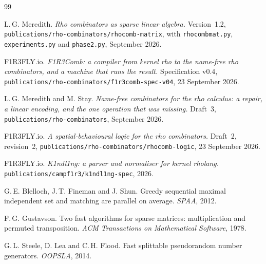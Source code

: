 \documentclass[11pt,a4paper]{article}
\newcommand{\code}[1]{\texttt{#1}}
\theoremstyle{definition}
\theoremstyle{plain}
\begin{document}
\begin{thebibliography}{99}

 L.\,G. Meredith.
\emph{Rho combinators as sparse linear algebra.} Version~1.2,
\code{publications/rho-combinators/rhocomb-matrix}, with \code{rhocombmat.py},
\code{experiments.py} and \code{phase2.py}, September 2026.

 F1R3FLY.io.
\emph{F1R3Comb: a compiler from kernel rho to the name-free rho combinators,
and a machine that runs the result.} Specification v0.4,
\code{publications/rho-combinators/f1r3comb-spec-v04}, 23 September 2026.

 L.\,G. Meredith and M. Stay.
\emph{Name-free combinators for the rho calculus: a repair, a linear encoding,
and the one operation that was missing.} Draft~3,
\code{publications/rho-combinators}, September 2026.

 F1R3FLY.io.
\emph{A spatial-behavioural logic for the rho combinators.} Draft~2,
revision~2, \code{publications/rho-combinators/rhocomb-logic}, 23 September
2026.

 F1R3FLY.io.
\emph{K1ndl1ng: a parser and normaliser for kernel rholang.}
\code{publications/campf1r3/k1ndl1ng-spec}, 2026.

 G.\,E. Blelloch, J.\,T. Fineman and J. Shun.
Greedy sequential maximal independent set and matching are parallel on
average. \emph{SPAA}, 2012.

 F.\,G. Gustavson.
Two fast algorithms for sparse matrices: multiplication and permuted
transposition. \emph{ACM Transactions on Mathematical Software}, 1978.

 G.\,L. Steele, D. Lea and C.\,H. Flood.
Fast splittable pseudorandom number generators. \emph{OOPSLA}, 2014.

\end{thebibliography}
\end{document}
